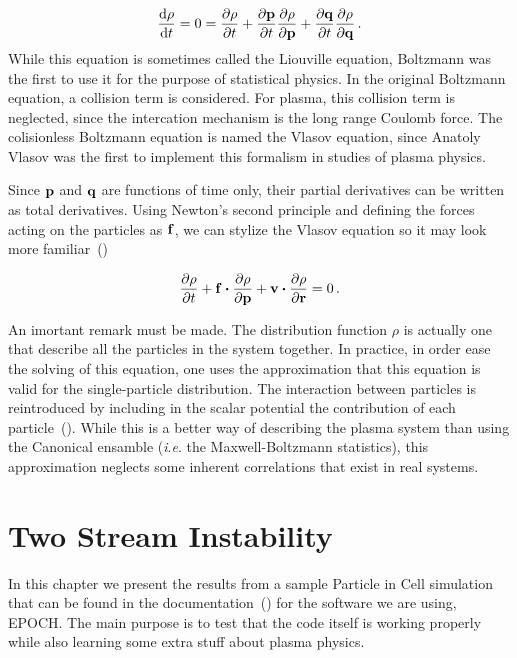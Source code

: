 \documentclass[12pt, class=report, crop=false]{standalone}
\begin{document}
\begin{equation}
  \dv{\rho}{t} = 0 = \pdv{\rho}{t} + \pdv{\vb{p}}{t} \pdv{\rho}{\vb{p}} + \pdv{\vb{q}}{t} \pdv{\rho}{\vb{q}} \,.
\end{equation}
While this equation is sometimes called the Liouville equation, Boltzmann was the first to use it for the purpose of statistical physics. In the original Boltzmann equation, a collision term is considered. For plasma, this collision term is neglected, since the intercation mechanism is the long range Coulomb force. The colisionless Boltzmann equation is named the Vlasov equation, since Anatoly Vlasov was the first to implement this formalism in studies of plasma physics.

Since \(\vb{p}\) and \(\vb{q}\) are functions of time only, their partial derivatives can be written as total derivatives. Using Newton's second principle and defining the forces acting on the particles as \(\vb{f}\), we can stylize the Vlasov equation so it may look more familiar~(\cite{feixUniversalModelVlasov2005})

\begin{equation}
  \pdv{\rho}{t} + \vb{f}\vdot\pdv{\rho}{\vb{p}} + \vb{v}\vdot\pdv{\rho}{\vb{r}} = 0\,.
\end{equation}

An imortant remark must be made. The distribution function \(\rho\) is actually one that describe all the particles in the system together. In practice, in order ease the solving of this equation, one uses the approximation that this equation is valid for the single-particle distribution. The interaction between particles is reintroduced by including in the scalar potential the contribution of each particle~(\cite{silimVlasovcodeSimulationsCollisionless2003}). While this is a better way of describing the plasma system than using the Canonical ensamble (\textit{i}.\textit{e}. the Maxwell-Boltzmann statistics), this approximation neglects some inherent correlations that exist in real systems.

\section{Two Stream Instability}

In this chapter we present the results from a sample Particle in Cell simulation that can be found in the documentation~(\cite{BasicExamplesUsing2020}) for the software we are using, EPOCH. The main purpose is to test that the code itself is working properly while also learning some extra stuff about plasma physics.
\end{document}
